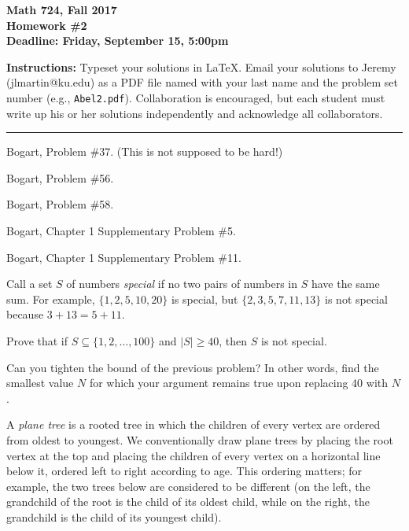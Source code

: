 

\thispagestyle{empty}

\textbf{Math 724, Fall 2017\\
Homework \#2\\
Deadline: Friday, September 15, 5:00pm}

\textbf{Instructions:} Typeset your solutions in LaTeX.  Email your solutions to Jeremy (jlmartin@ku.edu) as a PDF file named with your last name and the problem set number (e.g., {\tt Abel2.pdf}).  Collaboration is encouraged, but each student must write up his or her solutions independently and acknowledge all collaborators.

\medskip\hrule

\prob Bogart, Problem \#37.  (This is not supposed to be hard!)

\vfill\prob   Bogart, Problem \#56.

\vfill\prob   Bogart, Problem \#58.

\vfill\prob Bogart, Chapter 1 Supplementary Problem \#5.

\vfill\prob Bogart, Chapter 1 Supplementary Problem \#11.

\vfill\prob Call a set $S$ of numbers \emph{special} if no two pairs of numbers in $S$ have the same sum.  For example, $\{1,2,5,10,20\}$ is special, but $\{2,3,5,7,11,13\}$ is not special because $3+13=5+11$.

\probpart  Prove that if $S\subseteq\{1,2,\dots,100\}$ and $|S|\geq40$, then $S$ is not special.

\probpart  Can you tighten the bound of the previous problem?  In other words, find the smallest value $N$ for which your argument remains true upon replacing 40 with $N$.

\vfill\prob A \emph{plane tree} is a rooted tree in which the children of every vertex are ordered from oldest to youngest.  We conventionally draw plane trees by placing the root vertex at the top and placing the children of every vertex on a horizontal line below it, ordered left to right according to age.  This ordering matters; for example, the two trees below are considered to be different (on the left, the grandchild of the root is the child of its oldest child, while on the right, the grandchild is the child of its youngest child).

